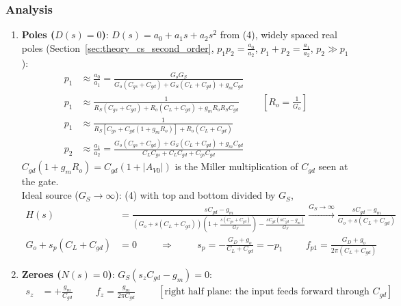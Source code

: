 \subsubsection{Analysis}
\begin{enumerate}
  \item \textbf{Poles (\(D(s) = 0\))}: \(D(s) = a_0 + a_1 s + a_2 s^2\) from (4), widely spaced
    real poles (Section~\ref{sec:theory_cs_second_order}, \(p_1 p_2 = \frac{a_0}{a_2}\),
    \(p_1 + p_2 = \frac{a_1}{a_2}\), \(p_2 \gg p_1\)):
    \begin{align*}
      p_1 &\approx \frac{a_0}{a_1} = \frac{G_o G_S}{G_o (C_{gs} + C_{gd}) + G_S (C_L + C_{gd}) + g_m C_{gd}} \\
      p_1 &\approx \frac{1}{R_S (C_{gs} + C_{gd}) + R_o (C_L + C_{gd}) + g_m R_o R_S C_{gd}} \hspace{1cm} \left[R_o = \tfrac{1}{G_o}\right] \\
      p_1 &\approx \frac{1}{R_S\left[C_{gs} + C_{gd}\left(1 + g_m R_o\right)\right] + R_o (C_L + C_{gd})} \\
      p_2 &\approx \frac{a_1}{a_2} = \frac{G_o (C_{gs} + C_{gd}) + G_S (C_L + C_{gd}) + g_m C_{gd}}{C_L C_{gs} + C_L C_{gd} + C_{gs} C_{gd}}
    \end{align*}
    \(C_{gd}(1 + g_m R_o) = C_{gd}(1 + |A_{V0}|)\) is the Miller multiplication of \(C_{gd}\) seen at
    the gate.\\
    Ideal source (\(G_S \to \infty\)): (4) with top and bottom divided by \(G_S\),
    \begin{align*}
      H(s) &= \frac{sC_{gd} - g_m}{(G_o + s(C_L + C_{gd}))\left(1 + \frac{s(C_{gs} + C_{gd})}{G_S}\right) - \frac{sC_{gd}(sC_{gd} - g_m)}{G_S}}
      \xrightarrow{G_S \to \infty} \frac{sC_{gd} - g_m}{G_o + s(C_L + C_{gd})} \tag{5} \\
      G_o + s_p(C_L + C_{gd}) &= 0 \hspace{1cm} \Rightarrow \hspace{1cm} s_p = -\frac{G_D + g_o}{C_L + C_{gd}} = -p_1 \hspace{1cm} f_{p1} = \frac{G_D + g_o}{2\pi(C_L + C_{gd})}
    \end{align*}
  \item \textbf{Zeroes (\(N(s) = 0\))}: \(G_S(s_z C_{gd} - g_m) = 0\):
    \begin{align*}
      s_z &= +\frac{g_m}{C_{gd}} \hspace{1cm} f_z = \frac{g_m}{2\pi C_{gd}} \hspace{1cm} [\text{right half plane: the input feeds forward through } C_{gd}]

\end{align*}
\end{enumerate}
